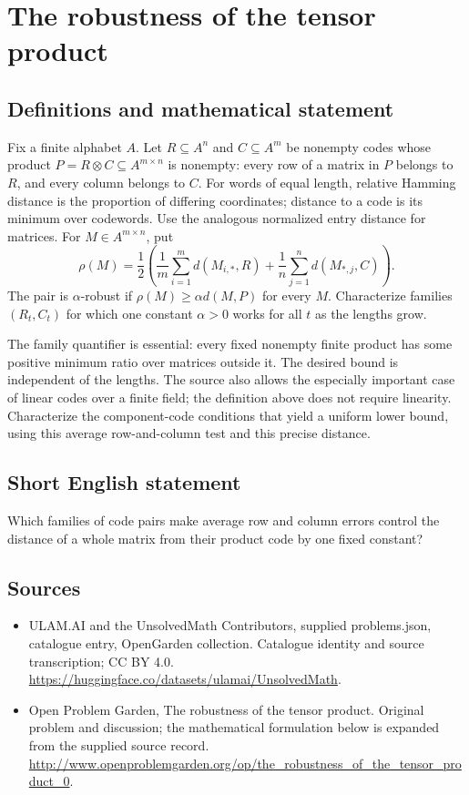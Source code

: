 \documentclass[11pt,a4paper]{article}
\begin{document}
\section*{The robustness of the tensor product}\label{statement}

\subsection{Definitions and mathematical statement}
Fix a finite alphabet $A$. Let $R\subseteq A^n$ and $C\subseteq A^m$
be nonempty codes whose product
$P=R\otimes C\subseteq A^{m\times n}$ is nonempty: every row of
a matrix in $P$ belongs to $R$, and every column belongs to $C$.
For words of equal length, relative Hamming distance is the proportion
of differing coordinates; distance to a code is its minimum over
codewords. Use the analogous normalized entry distance for matrices.
For $M\in A^{m\times n}$, put
\[
 \rho(M)=\frac12\left(\frac1m\sum_{i=1}^m d(M_{i,*},R)
                  +\frac1n\sum_{j=1}^n d(M_{*,j},C)\right).
\]
The pair is $\alpha$-robust if $\rho(M)\ge\alpha d(M,P)$ for every
$M$. Characterize families $(R_t,C_t)$ for which one constant
$\alpha>0$ works for all $t$ as the lengths grow.

The family quantifier is essential: every fixed nonempty finite
product has some positive minimum ratio over matrices outside it.
The desired bound is independent of the lengths. The source also
allows the especially important case of linear codes over a finite
field; the definition above does not require linearity. Characterize
the component-code conditions that yield a uniform lower bound,
using this average row-and-column test and this precise distance.
\subsection{Short English statement}
Which families of code pairs make average row and column errors control the distance of a whole matrix from their product code by one fixed constant?
\subsection{Sources}
\begin{itemize}
\item[S1] ULAM.AI and the UnsolvedMath Contributors, supplied problems.json, catalogue entry, OpenGarden collection. Catalogue identity and source transcription; CC BY 4.0.
\url{https://huggingface.co/datasets/ulamai/UnsolvedMath}.
\item[S2] Open Problem Garden, The robustness of the tensor product. Original problem and discussion; the mathematical formulation below is expanded from the supplied source record.
\url{http://www.openproblemgarden.org/op/the_robustness_of_the_tensor_product_0}.
\end{itemize}
\end{document}
